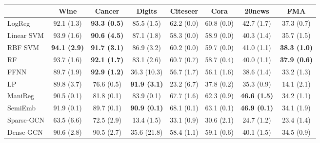 \documentclass{article}
\newcommand{\lds}{\textsc{LDS}\xspace}
\begin{document}
\begin{table*}[t]
\caption{Test accuracy ( standard deviation) in percentage on various classification datasets. The best results and the statistical competitive ones (by paired t-test with ) are in bold. All experiments have been repeated with 5 different random seeds. We compare NN-\lds to several supervised baselines and semi-supervised learning methods. No graph is provided as input. NN-\lds achieves high accuracy results on most of the datasets and yields the highest gains on datasets with underlying graphs (Citeseer, Cora).}
\label{tab:ssvsd:big}
\begin{center}
\begin{small}
\begin{tabular}{lccccccc}
\toprule
            & Wine          & Cancer & Digits        & Citeseer        & Cora            & 20news          & FMA             \\
\midrule
LogReg      & 92.1 (1.3) & \textbf{93.3 (0.5)}  & 85.5 (1.5) & 62.2 (0.0)       & 60.8 (0.0)       & 42.7 (1.7)   & 37.3 (0.7)   \\
Linear SVM  & 93.9 (1.6) & \textbf{90.6 (4.5)}  & 87.1 (1.8) & 58.3 (0.0)       & 58.9 (0.0)       & 40.3 (1.4)   & 35.7 (1.5)   \\
RBF SVM     & \textbf{94.1 (2.9)} & \textbf{91.7 (3.1)}  & 86.9 (3.2) & 60.2 (0.0)       & 59.7 (0.0)       & 41.0 (1.1)    & \textbf{38.3 (1.0)}   \\
RF          & 93.7 (1.6) & \textbf{92.1 (1.7)}  & 83.1 (2.6) & 60.7 (0.7)   & 58.7 (0.4)   & 40.0 (1.1)     & \textbf{37.9 (0.6)}   \\
FFNN    & 89.7 (1.9) & \textbf{92.9 (1.2)}  & 36.3 (10.3) & 56.7 (1.7)   & 56.1 (1.6)   & 38.6 (1.4)   & 33.2 (1.3)   \\
\midrule
LP   & 89.8 (3.7) & 76.6 (0.5)   & \textbf{91.9 (3.1)} & 23.2 (6.7)   & 37.8 (0.2)   & 35.3 (0.9)   & 14.1 (2.1)   \\
ManiReg & 90.5 (0.1) & 81.8 (0.1)  & 83.9 (0.1) & 67.7 (1.6) & 62.3 (0.9) & \textbf{46.6 (1.5)} & 34.2 (1.1) \\
SemiEmb & 91.9 (0.1) & 89.7 (0.1)  & \textbf{90.9 (0.1)} & 68.1 (0.1) & 63.1 (0.1) & \textbf{46.9 (0.1)} & 34.1 (1.9) \\
\midrule
Sparse-GCN   & 63.5 (6.6)  & 72.5 (2.9) & 13.4 (1.5)   & 33.1 (0.9)   & 30.6 (2.1)   & 24.7 (1.2) & 23.4 (1.4)  \\
Dense-GCN    & 90.6 (2.8) & 90.5 (2.7)  & 35.6 (21.8) & 58.4 (1.1)   & 59.1 (0.6)   & 40.1 (1.5)   & 34.5 (0.9)   \\

\end{tabular}
\end{small}
\end{center}
\end{table*}
\end{document}
